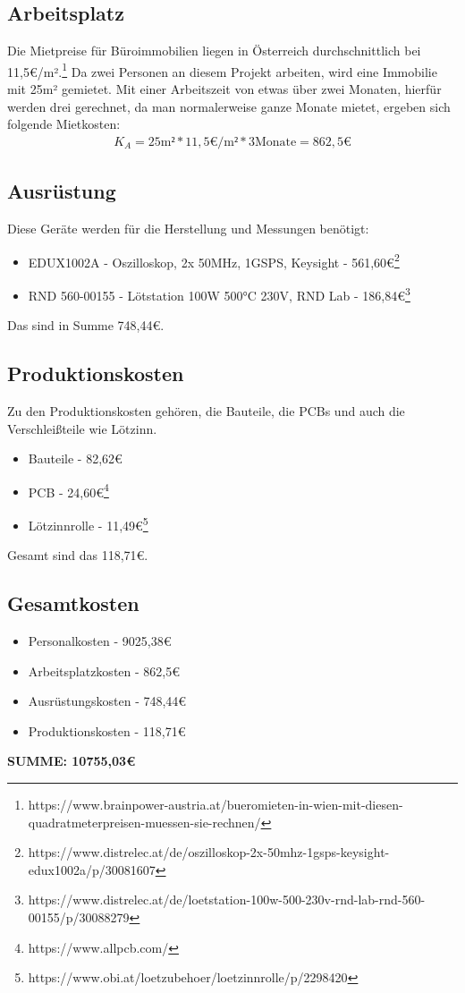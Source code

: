 \documentclass[paper=a4, 12pt]{scrreprt}
\begin{document}
		\subsection{Arbeitsplatz}\hfill \break
		Die Mietpreise für Büroimmobilien liegen in Österreich durchschnittlich bei 11,5€/m².\footnote{https://www.brainpower-austria.at/bueromieten-in-wien-mit-diesen-quadratmeterpreisen-muessen-sie-rechnen/} Da zwei Personen an diesem Projekt arbeiten, wird eine Immobilie mit 25m² gemietet. Mit einer Arbeitszeit von etwas über zwei Monaten, hierfür werden drei gerechnet, da man normalerweise ganze Monate mietet, ergeben sich folgende Mietkosten:
		\begin{align*} 
		K_{ A } = 25\text{m²} * 11,5\text{€/m²} * 3\text{Monate} = 862,5\text{€}
		\end{align*} 
		\subsection{Ausrüstung}\hfill \break
		Diese Geräte werden für die Herstellung und Messungen benötigt:
		\begin{itemize}
			\item EDUX1002A - Oszilloskop, 2x 50MHz, 1GSPS, Keysight - 561,60€\footnote{https://www.distrelec.at/de/oszilloskop-2x-50mhz-1gsps-keysight-edux1002a/p/30081607}
			\item RND 560-00155 - Lötstation 100W 500°C 230V, RND Lab - 186,84€\footnote{https://www.distrelec.at/de/loetstation-100w-500-230v-rnd-lab-rnd-560-00155/p/30088279}
		\end{itemize}
		Das sind in Summe 748,44€.
		\newpage
		
		\subsection{Produktionskosten}\hfill \break
		Zu den Produktionskosten gehören, die Bauteile, die PCBs und auch die Verschleißteile wie Lötzinn.
		\begin{itemize}
			\item Bauteile - 82,62€
			\item PCB - 24,60€\footnote{https://www.allpcb.com/}
			\item Lötzinnrolle - 11,49€\footnote{https://www.obi.at/loetzubehoer/loetzinnrolle/p/2298420}
		\end{itemize}
		Gesamt sind das 118,71€.
		
		\subsection{Gesamtkosten}\hfill \break
		\begin{itemize}
			\item Personalkosten - 9025,38€
			\item Arbeitsplatzkosten - 862,5€
			\item Ausrüstungskosten - 748,44€
			\item Produktionskosten - 118,71€
		\end{itemize}
		\textbf{SUMME: 10755,03€}
		\newpage	
	
\end{document}
